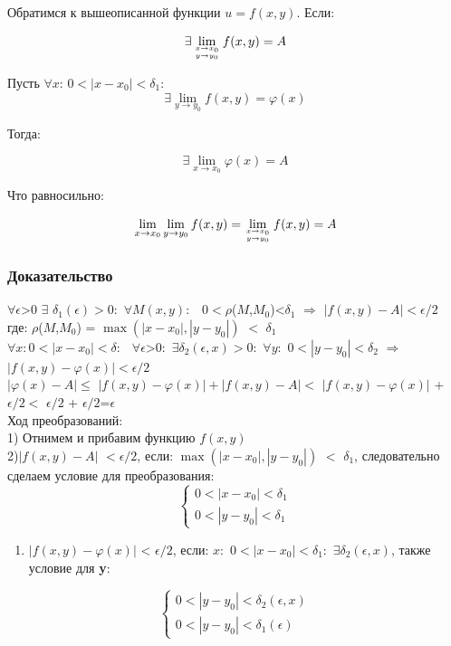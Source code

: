 Обратимся к вышеописанной функции \(u=f(x, y)\). Если:

\[\exists\lim _{x \rightarrow x_{0} \atop y \rightarrow y_{0} } f(x, y)=A\]

Пусть \(\forall\)\(x\): \(0<\left|x-x_{0}\right|<\delta_{1}\):
\[\exists\lim _{y \rightarrow y_{0}} f(x, y)=\varphi(x)\]

Тогда:

\[\exists\lim _{x \rightarrow x_{0}} \varphi(x)=A\]

Что равносильно:

\[\lim _{x \rightarrow x_{0}} \lim _{y \rightarrow y_{0}} f(x, y)=\lim _{x \rightarrow x_{0} \atop y \rightarrow y_{0}} f(x, y)=A\]

\subsubsection{Доказательство}

\(\forall \epsilon\)\textgreater{}0 \(\exists\)
\(\delta_{1}(\epsilon) > 0:\)
\(\forall M(x,y):\) \ \(0<\rho\)(\(M\),\(M_{0}\))\textless{}\(\delta_{1}\)
\(\Rightarrow\) \(\left|f(x,y)-A\right|<\epsilon/ 2\) \\

где: \(\rho\)(\(M\),\(M_{0}\)) = \(\max(|x-x_{0}|,| y-y_{0}|)\)
\(<\) \(\delta_{1}\) \\

\(\forall x:0<|x-x_{0}|<\delta:\)
\(\ \ \forall \epsilon\)\textgreater{}0\(:\)
\(\exists \delta_{2}(\epsilon,x)>0:\) \(\forall y:\)
\(0<\left|y-y_{0}\right|<\delta_{2}\) \(\Rightarrow\)
\(\left|f(x,y)-\varphi(x)\right|<\epsilon/ 2\) \\

\(\left|\varphi(x)-A\right|\leq\)
\(|f(x, y)-\varphi(x)|+| f(x, y)-A|\)\(<\) \(|f(x, y)-\varphi(x)|\) +
\(\epsilon/2<\) \(\epsilon/ 2\) + \(\epsilon/ 2\)=\(\epsilon\) \\

Ход преобразований: \\
1) Отнимем и прибавим функцию \(f(x,y)\) \\
2)\(| f(x, y)-A|\) \(< \epsilon /2\), если: \(\max(|x-x_{0}|,| y-y_{0}|)\)
\(<\) \(\delta_{1}\), следовательно сделаем условие для преобразования: \\

\[\left\{\begin{array}{l}
0<\left|x-x_{0}\right|<\delta_{1} \\
0<\left|y-y_{0}\right|<\delta_{1}
\end{array}\right.\]

\begin{enumerate}
\def\labelenumi{\arabic{enumi})}
\setcounter{enumi}{2}
\tightlist
\item
  \(|f(x, y)-\varphi(x)|\) \textless{} \(\epsilon /2\), если: \(x:\)
  \(0<\left|x-x_{0}\right|<\delta_{1}:\)
  \(\exists \delta_{2}(\epsilon, x)\), также условие для \textbf{y}:
\end{enumerate}

\[\left\{\begin{array}{l}
0<\left|y-y_{0}\right|<\delta_{2}(\epsilon, x) \\
0<\left|y-y_{0}\right|<\delta_{1}(\epsilon)
\end{array}\right.\]
